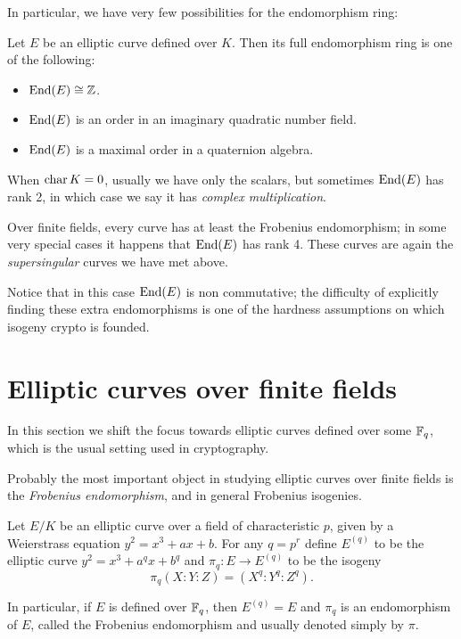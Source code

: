 In particular, we have very few possibilities for the endomorphism ring:
\begin{theorem}
    Let $E$ be an elliptic curve defined over $K$. Then its full endomorphism ring is one of the following:
    \begin{itemize}
        \item $\operatorname{End}(E)\cong\mathbb{Z}$.
        \item $\operatorname{End}(E)$ is an order in an imaginary quadratic number field.
        \item $\operatorname{End}(E)$ is a maximal order in a quaternion algebra.
    \end{itemize}
\end{theorem}

When $\operatorname{char} K=0$, usually we have only the scalars, but sometimes $\operatorname{End}(E)$ has rank 2, in which case we say it has \emph{complex multiplication}.

Over finite fields, every curve has at least the Frobenius endomorphism; in some very special cases it happens that $\operatorname{End}(E)$ has rank 4. These curves are again the \emph{supersingular} curves we have met above.

Notice that in this case $\operatorname{End}(E)$ is non commutative; the difficulty of explicitly finding these extra endomorphisms is one of the hardness assumptions on which isogeny crypto is founded.


\section{Elliptic curves over finite fields}

In this section we shift the focus towards elliptic curves defined over some $\mathbb{F}_q$, which is the usual setting used in cryptography.

Probably the most important object in studying elliptic curves over finite fields is the \emph{Frobenius endomorphism}, and in general Frobenius isogenies.

\begin{definition}
    Let $E/K$ be an elliptic curve over a field of characteristic $p$, given by a Weierstrass equation $y^2=x^3+ax+b$. For any $q=p^r$ define $E^{(q)}$ to be the elliptic curve $y^2=x^3+a^qx+b^q$ and $\pi_q:E\to E^{(q)}$ to be the isogeny $$\pi_q(X:Y:Z)=(X^q:Y^q:Z^q).$$
    
    In particular, if $E$ is defined over $\mathbb{F}_q$, then $E^{(q)}=E$ and $\pi_q$ is an endomorphism of $E$, called the Frobenius endomorphism and usually denoted simply by $\pi$.
\end{definition}

